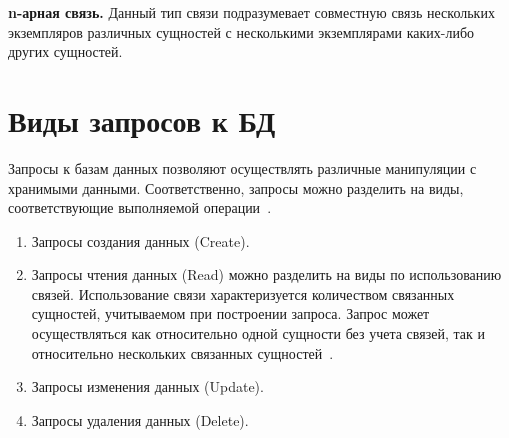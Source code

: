 \textbf{n-арная связь.} Данный тип связи подразумевает совместную связь нескольких экземпляров различных сущностей с несколькими экземплярами каких-либо других сущностей.

\section{Виды запросов к БД}

Запросы к базам данных позволяют осуществлять различные манипуляции с хранимыми данными. Соответственно, запросы можно разделить на виды, соответствующие выполняемой операции~\cite{truica2015performance}. 

\begin{enumerate}
	\item Запросы создания данных (Create). 
	\item Запросы чтения данных (Read) можно разделить на виды по использованию связей. Использование связи характеризуется количеством связанных сущностей, учитываемом при построении запроса. Запрос может осуществляться как относительно одной сущности без учета связей, так и относительно нескольких связанных сущностей~\cite{li2021teaching}\cite{mancini2022efficient}. 
	\item Запросы изменения данных (Update).
	\item Запросы удаления данных (Delete).
\end{enumerate}
